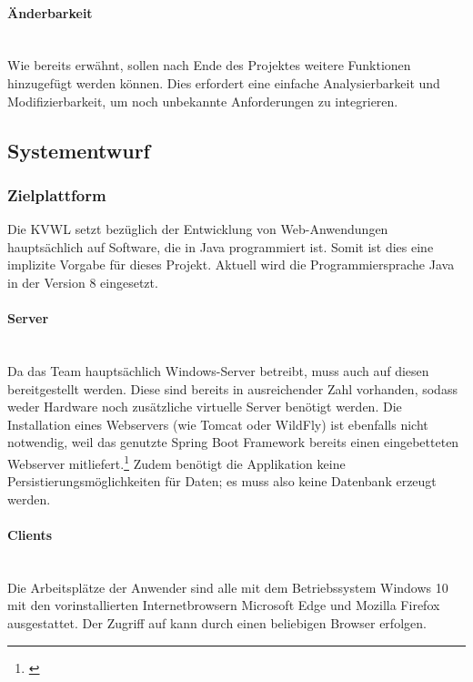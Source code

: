 \paragraph{Änderbarkeit} ~\\
\label{p:Aenderbarkeit}
Wie bereits erwähnt, sollen nach Ende des Projektes weitere Funktionen hinzugefügt werden können. Dies erfordert eine einfache Analysierbarkeit und Modifizierbarkeit, um noch unbekannte Anforderungen zu integrieren.

\subsection{Systementwurf}
\label{sec:Systementwurf}

\subsubsection{Zielplattform}
\label{sec:Zielplattform}
Die \ac{KVWL} setzt bezüglich der Entwicklung von Web-Anwendungen hauptsächlich auf Software, die in Java programmiert ist. Somit ist dies eine implizite Vorgabe für dieses Projekt. Aktuell wird die Programmiersprache Java in der Version 8 eingesetzt.

\paragraph{Server} ~\\
\label{p:Server}
 Da das Team \teamName hauptsächlich Windows-Server betreibt, muss auch \projektName auf diesen bereitgestellt werden. Diese sind bereits in ausreichender Zahl vorhanden, sodass weder Hardware noch zusätzliche virtuelle Server benötigt werden. Die Installation eines Webservers (wie Tomcat oder WildFly) ist ebenfalls nicht notwendig, weil das genutzte Spring Boot Framework bereits einen eingebetteten Webserver mitliefert.\footnote{\Vgl \cite{spring:web}} Zudem benötigt die Applikation keine Persistierungsmöglichkeiten für Daten; es muss also keine Datenbank erzeugt werden.
 
\paragraph{Clients} ~\\
\label{p:Clients}
 Die Arbeitsplätze der Anwender sind alle mit dem Betriebssystem Windows 10 mit den vorinstallierten Internetbrowsern Microsoft Edge und Mozilla Firefox ausgestattet. Der Zugriff auf \projektName kann durch einen beliebigen Browser erfolgen.

